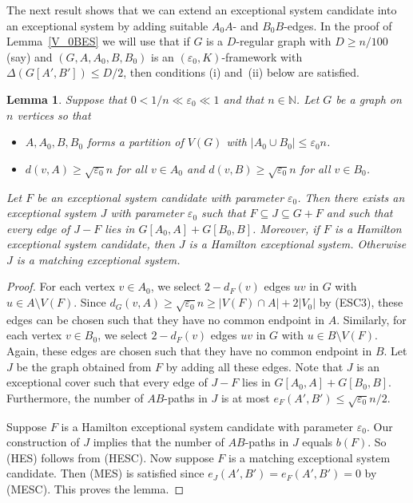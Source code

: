 \documentclass{memo-l}
\newtheorem{lemma}[firstthm]{Lemma}
\def\COMMENT#1{}
\def\eps{\varepsilon}
\def\epszero{\eps_0}
\numberwithin{section}{chapter}
\numberwithin{equation}{section}
\numberwithin{firstthm}{section}
\numberwithin{figure}{section}
\begin{document}
The next result shows that we can extend an exceptional system candidate into an exceptional system by adding suitable $A_0A$- and $B_0B$-edges.
In the proof of Lemma~\ref{V_0BES} we will use that if $G$ is a $D$-regular graph with $D\ge n/100$ (say) and  $(G,A,A_0,B,B_0)$ is an $(\epszero,K)$-framework
with $\Delta(G[A',B'])\le D/2$, then conditions (i) and~(ii) below are satisfied.
\begin{lemma} \label{lma:ESextend}
Suppose that $ 0 < 1/n \ll \epszero \ll 1$ and that $n \in \mathbb{N}$.
Let $G$ be a graph on $n$ vertices so that%
\COMMENT{previously, we said that $G$ is a framework instead of the 1stcondition below. But then we have to define a framework in paper4, which
we don't want to do.}
\begin{itemize}
\item[{\rm (i)}] $A,A_0,B,B_0$ forms a partition of $V(G)$ with $|A_0 \cup B_0| \le \eps_0 n$. 
\item[{\rm (ii)}] $d(v,A) \ge \sqrt{\epszero} n$ for all $v \in A_0$ and $d(v,B) \ge \sqrt{\epszero} n$ for all $v \in B_0$.
\end{itemize}
Let $F$ be an exceptional system candidate with parameter $\eps_0$. 
Then there exists an exceptional system $J$ with parameter $\eps_0$ such that $F\subseteq J\subseteq G+ F$
and such that every edge of $J-F$ lies in $G[A_0,A]+G[B_0,B]$.
Moreover, if $F$ is a Hamilton exceptional system candidate, then $J$ is a Hamilton exceptional system.
Otherwise $J$ is a matching exceptional system.
\end{lemma}
\begin{proof}
For each vertex $v \in A_0$, we select $2-d_{F}(v)$ edges $uv$ in $G$ with $u \in A \setminus V(F)$.
Since $ d_G(v,A) \ge \sqrt{\epszero} n \ge |V(F) \cap A| + 2|V_0|$ by (ESC3), these edges can be chosen such that they have no common endpoint in $A$.
Similarly, for each vertex $v \in B_0$, we select $2-d_{F}(v)$ edges $uv$ in $G$ with $u \in B \setminus V(F)$.
Again, these edges are chosen such that they have no common endpoint in $B$. Let $J$ be the graph obtained from $F$ by adding all these edges. 
Note that $J$ is an exceptional cover such that every edge of $J-F$ lies in $G[A_0,A]+G[B_0,B]$.
Furthermore, the number of $AB$-paths in $J$ is at most $e_F(A',B') \le \sqrt{\epszero} n/2$.


Suppose $F$ is a Hamilton exceptional system candidate with parameter $\eps_0$.
Our construction of $J$ implies that the number of $AB$-paths in $J$  equals $b(F)$. So (HES) follows from (HESC).
Now suppose $F$ is a matching exceptional system candidate. Then (MES) is satisfied since $e_J(A',B')=e_F(A',B')=0$ by (MESC). This proves the lemma.
\end{proof}
\end{document}
